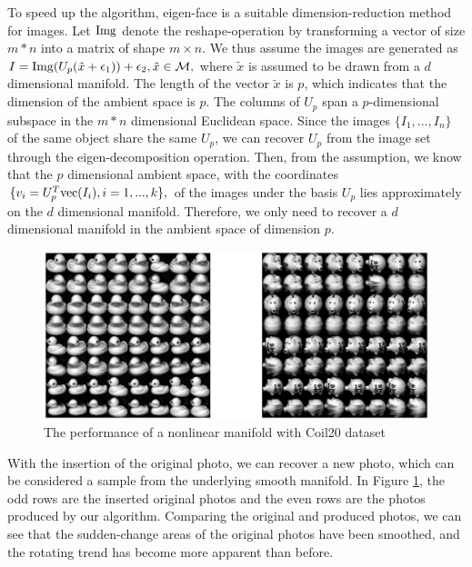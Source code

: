 \documentclass{article}
\theoremstyle{remark}
\begin{document}
To speed up the algorithm, eigen-face \cite{slavkovic2012face,turk1991face} is a suitable dimension-reduction method for images. Let ${\rm Img}$ denote the reshape-operation by transforming a vector of size $m*n$ into a matrix of shape $m\times n$. We thus assume the images are generated as
$
I = {\rm Img} (U_{p}(\tilde{x}+\epsilon_1))+\epsilon_2, \tilde{x}\in \cal M,
$
where $\tilde{x}$ is assumed to be drawn from a $d$ dimensional manifold. The length of the vector $\tilde{x}$ is $p$, which indicates that the dimension of the ambient space is $p$. The columns of $U_p$ span a $p$-dimensional subspace in the $m*n$ dimensional Euclidean space. 
Since the images $\{I_1,...,I_n\}$ of the same object share the same $U_p$, we can recover $U_p$ from the image set through the eigen-decomposition operation. Then, from the assumption, we know that the $p$ dimensional ambient space, with the coordinates 
$
\{v_i = U_p^T {\rm vec}(I_i), i = 1,...,k\},
$
of the images under the basis $U_p$ lies approximately on the $d$ dimensional manifold. Therefore, we only need to recover a $d$ dimensional manifold in the ambient space of dimension $p$.
\vspace{-4mm}
\begin{figure}[ht] %
   \centering
   \includegraphics[width=\linewidth]{real.eps} 
   \vspace{-0.8cm}
   \caption{The performance of a nonlinear manifold with Coil20 dataset}
   \label{fig:example Coil20}
\end{figure}
\vspace{-3mm}
With the insertion of the original photo, we can recover a new photo, which can be considered a sample from the underlying smooth manifold. In Figure \ref{fig:example Coil20}, the odd rows are the inserted original photos and the even rows are the photos produced by our algorithm. Comparing the original and produced photos, we can see that the sudden-change areas of the original photos have been smoothed, and the rotating trend has become more apparent than before.
\end{document}
